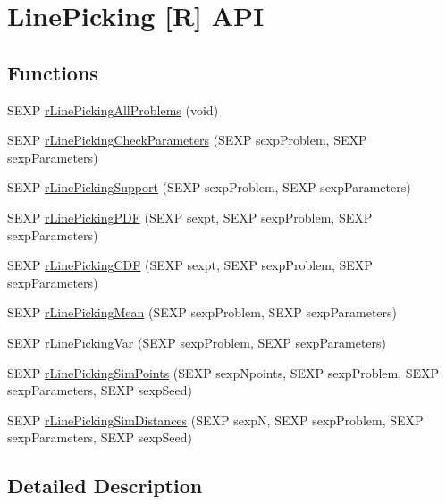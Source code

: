 \hypertarget{group__rapi}{\section{Line\-Picking \mbox{[}R\mbox{]} A\-P\-I}
\label{group__rapi}
}
\subsection*{Functions}
\begin{DoxyCompactItemize}
\item 
S\-E\-X\-P \hyperlink{group__rapi_ga02145a395d24bbe929ffa57688c72ef5}{r\-Line\-Picking\-All\-Problems} (void)
\item 
S\-E\-X\-P \hyperlink{group__rapi_ga9b3ba58aca598b6ee8f7239e87f3076c}{r\-Line\-Picking\-Check\-Parameters} (S\-E\-X\-P sexp\-Problem, S\-E\-X\-P sexp\-Parameters)
\item 
S\-E\-X\-P \hyperlink{group__rapi_ga6b30fc1bdbca2a3cc7f5340f1d8b44d5}{r\-Line\-Picking\-Support} (S\-E\-X\-P sexp\-Problem, S\-E\-X\-P sexp\-Parameters)
\item 
S\-E\-X\-P \hyperlink{group__rapi_gafe4502dd2e61ac946bfe6543fb38dd39}{r\-Line\-Picking\-P\-D\-F} (S\-E\-X\-P sexpt, S\-E\-X\-P sexp\-Problem, S\-E\-X\-P sexp\-Parameters)
\item 
S\-E\-X\-P \hyperlink{group__rapi_gac85aaf9284a29359e0d534ac1641b3f2}{r\-Line\-Picking\-C\-D\-F} (S\-E\-X\-P sexpt, S\-E\-X\-P sexp\-Problem, S\-E\-X\-P sexp\-Parameters)
\item 
S\-E\-X\-P \hyperlink{group__rapi_ga4316d34063551a4121f4cc0b7959b166}{r\-Line\-Picking\-Mean} (S\-E\-X\-P sexp\-Problem, S\-E\-X\-P sexp\-Parameters)
\item 
S\-E\-X\-P \hyperlink{group__rapi_gac2d2e36336e7c32427a9e99ccc67d18e}{r\-Line\-Picking\-Var} (S\-E\-X\-P sexp\-Problem, S\-E\-X\-P sexp\-Parameters)
\item 
S\-E\-X\-P \hyperlink{group__rapi_gacf32b79fce86f86cedc7843775e163c3}{r\-Line\-Picking\-Sim\-Points} (S\-E\-X\-P sexp\-Npoints, S\-E\-X\-P sexp\-Problem, S\-E\-X\-P sexp\-Parameters, S\-E\-X\-P sexp\-Seed)
\item 
S\-E\-X\-P \hyperlink{group__rapi_ga1d8792844b8fb2bfe583d80d7580938d}{r\-Line\-Picking\-Sim\-Distances} (S\-E\-X\-P sexp\-N, S\-E\-X\-P sexp\-Problem, S\-E\-X\-P sexp\-Parameters, S\-E\-X\-P sexp\-Seed)
\end{DoxyCompactItemize}


\subsection{Detailed Description}


